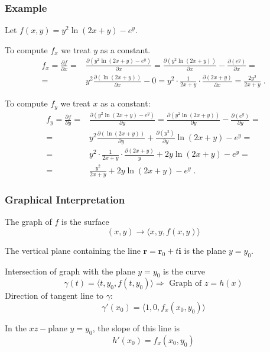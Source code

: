 \begin{frame}
  \frametitle{Example}
  Let $f(x,y) = y^2\ln{(2x+y)}- e^y$.

To compute $f_x$ \pause we treat $y$ as a constant.\pause
%
\begin{align*}
  f_x = \frac{\partial f}{\partial x} = & \frac{\partial(y^2\ln{(2x+y)}- e^y)}{\partial x} = \frac{\partial(y^2\ln{(2x+y)})}{\partial x} - \frac{\partial(e^y)}{\partial x} = \\
  = & y^2 \frac{\partial(\ln{(2x+y)})}{\partial x} - 0 = y^2 \cdot \frac{1}{2x+y} \cdot \frac{\partial(2x+y)}{\partial x}= \frac{2y^2}{2x+y}\; .
\end{align*}

\pause To compute $f_y$ we treat $x$ as a constant:\pause
%
\begin{align*}
  f_y = \frac{\partial f}{\partial y} = & \frac{\partial(y^2\ln{(2x+y)}- e^y)}{\partial y} = \frac{\partial(y^2\ln{(2x+y)})}{\partial y} - \frac{\partial(e^y)}{\partial y} = \\
  = & y^2 \frac{\partial(\ln{(2x+y)})}{\partial y} +\frac{\partial(y^2)}{\partial y} \ln{(2x+y)}
   - e^y = \\
   = & y^2 \cdot \frac{1}{2x+y} \cdot \frac{\partial(2x+y)}{y} +2y\ln{(2x+y)} - e^y = \\
   = & \frac{y^2}{2x+y} +2y\ln{(2x+y)} - e^y \; .
\end{align*}
\end{frame}

\begin{frame}
\frametitle{Graphical Interpretation}

The graph of $f$ is the surface
%
$$(x,y) \to  \langle x,y, f(x,y) \rangle$$

The vertical plane containing the line $\textbf{r}=\textbf{r}_0 + t\textbf{i}$ is the plane $y=y_0$.

Intersection of graph with the plane $y=y_0$ is the curve
%
$$\gamma(t) = \langle t, y_0, f(t,y_0) \rangle \Longrightarrow \text{ Graph of } z=h(x)$$
%
Direction of tangent line to $\gamma$:
%
$$\gamma'(x_0) = \langle 1,0,f_x(x_0,y_0) \rangle$$

In the $xz-$plane $y=y_0$, the slope of this line is
%
$$h'(x_0) = f_x(x_0,y_0)$$
\end{frame}

